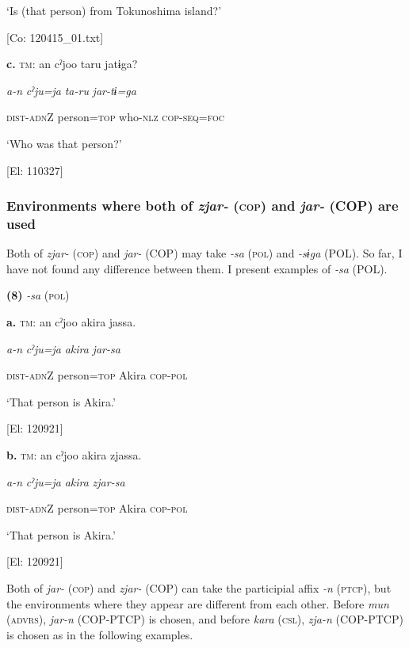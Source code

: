       ‘Is (that person) from Tokunoshima island?’

      [Co: 120415\_01.txt]

  \textbf{c.}  \textsc{tm}:  an  cˀjoo  taru  jatɨga?

      \textit{a-n}  \textit{cˀju=ja}  \textit{ta-ru}  \textit{jar-tɨ=ga}

      \textsc{dist}-\textsc{adn}Z  person=\textsc{top}  who-\textsc{nlz}  \textsc{cop}-\textsc{seq}=\textsc{foc}

      ‘Who was that person?’

      [El: 110327]

\subsubsection{Environments where both of \textit{zjar-} (\textsc{cop}) and \textit{jar-} (COP) are used}

Both of \textit{zjar-} (\textsc{cop}) and \textit{jar-} (COP) may take \textit{{}-sa} (\textsc{pol}) and \textit{{}-sɨga} (POL). So far, I have not found any difference between them. I present examples of \textit{{}-sa} (POL).

\textbf{(8)}  \textit{{}-sa} (\textsc{pol})

  \textbf{a.}  \textsc{tm}:  an  cˀjoo  akira  jassa.

      \textit{a-n}  \textit{cˀju=ja}  \textit{akira}  \textit{jar-sa}

      \textsc{dist}-\textsc{adn}Z  person=\textsc{top}  Akira  \textsc{cop}-\textsc{pol}

      ‘That person is Akira.’

      [El: 120921]

  \textbf{b.}  \textsc{tm}:  an  cˀjoo  akira  zjassa.

      \textit{a-n}  \textit{cˀju=ja}  \textit{akira}  \textit{zjar-sa}

      \textsc{dist}-\textsc{adn}Z  person=\textsc{top}  Akira  \textsc{cop}-\textsc{pol}

      ‘That person is Akira.’

      [El: 120921]

Both of \textit{jar-} (\textsc{cop}) and \textit{zjar-} (COP) can take the participial affix \textit{{}-n} (\textsc{ptcp}), but the environments where they appear are different from each other. Before \textit{mun} (\textsc{advrs}), \textit{jar-n} (COP-PTCP) is chosen, and before \textit{kara} (\textsc{csl}), \textit{zja-n} (COP-PTCP) is chosen as in the following examples.

